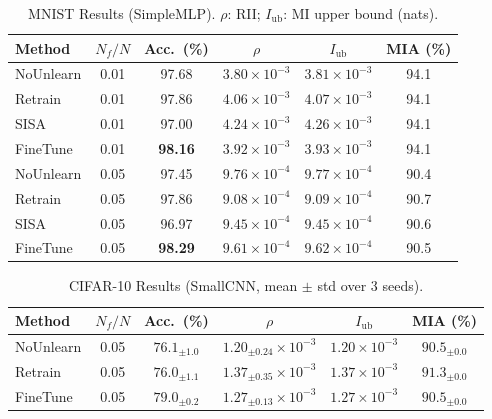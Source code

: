 \documentclass[journal]{IEEEtran}
\theoremstyle{definition}
\begin{document}
\begin{table}[t]
\centering
\caption{MNIST Results (SimpleMLP). $\rho$: RII; $I_{\mathrm{ub}}$: MI upper bound (nats).}\label{tab:mnist}
\setlength{\tabcolsep}{3pt}
\begin{tabular}{l c c c c c}
\toprule
Method & $N_f/N$ & Acc.\ (\%) & $\rho$ & $I_{\mathrm{ub}}$ & MIA (\%) \\
\midrule
NoUnlearn  & 0.01 & 97.68 & $3.80{\times}10^{-3}$ & $3.81{\times}10^{-3}$ & 94.1 \\
Retrain    & 0.01 & 97.86 & $4.06{\times}10^{-3}$ & $4.07{\times}10^{-3}$ & 94.1 \\
SISA       & 0.01 & 97.00 & $4.24{\times}10^{-3}$ & $4.26{\times}10^{-3}$ & 94.1 \\
FineTune   & 0.01 & \textbf{98.16} & $3.92{\times}10^{-3}$ & $3.93{\times}10^{-3}$ & 94.1 \\
\midrule
NoUnlearn  & 0.05 & 97.45 & $9.76{\times}10^{-4}$ & $9.77{\times}10^{-4}$ & 90.4 \\
Retrain    & 0.05 & 97.86 & $9.08{\times}10^{-4}$ & $9.09{\times}10^{-4}$ & 90.7 \\
SISA       & 0.05 & 96.97 & $9.45{\times}10^{-4}$ & $9.45{\times}10^{-4}$ & 90.6 \\
FineTune   & 0.05 & \textbf{98.29} & $9.61{\times}10^{-4}$ & $9.62{\times}10^{-4}$ & 90.5 \\
\bottomrule
\end{tabular}
\end{table}

\begin{table}[t]
\centering
\caption{CIFAR-10 Results (SmallCNN, mean $\pm$ std over 3 seeds).}\label{tab:cifar10}
\setlength{\tabcolsep}{2.5pt}
\begin{tabular}{l c c c c c}
\toprule
Method & $N_f/N$ & Acc.\ (\%) & $\rho$ & $I_{\mathrm{ub}}$ & MIA (\%) \\
\midrule
NoUnlearn  & 0.05 & $76.1_{\pm1.0}$ & $1.20_{\pm0.24}{\times}10^{-3}$ & $1.20{\times}10^{-3}$ & $90.5_{\pm0.0}$ \\
Retrain    & 0.05 & $76.0_{\pm1.1}$ & $1.37_{\pm0.35}{\times}10^{-3}$ & $1.37{\times}10^{-3}$ & $91.3_{\pm0.0}$ \\
FineTune   & 0.05 & \textbf{$79.0_{\pm0.2}$} & $1.27_{\pm0.13}{\times}10^{-3}$ & $1.27{\times}10^{-3}$ & $90.5_{\pm0.0}$ \\
\bottomrule
\end{tabular}
\end{table}
\end{document}
